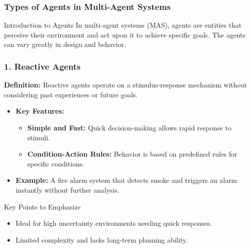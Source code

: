 \documentclass[aspectratio=169]{beamer}
\begin{document}
\begin{frame}[fragile]
    \frametitle{Types of Agents in Multi-Agent Systems}
    \begin{block}{Introduction to Agents}
        In multi-agent systems (MAS), agents are entities that perceive their environment and act upon it to achieve specific goals. The agents can vary greatly in design and behavior.
    \end{block}
\end{frame}

\begin{frame}[fragile]
    \frametitle{1. Reactive Agents}
    \textbf{Definition:}  
    Reactive agents operate on a stimulus-response mechanism without considering past experiences or future goals.

    \begin{itemize}
        \item \textbf{Key Features:}
        \begin{itemize}
            \item \textbf{Simple and Fast:} Quick decision-making allows rapid response to stimuli.
            \item \textbf{Condition-Action Rules:} Behavior is based on predefined rules for specific conditions.
        \end{itemize}
        \item \textbf{Example:} 
        A fire alarm system that detects smoke and triggers an alarm instantly without further analysis.
    \end{itemize}
    
    \begin{block}{Key Points to Emphasize}
        \begin{itemize}
            \item Ideal for high uncertainty environments needing quick responses.
            \item Limited complexity and lacks long-term planning ability.
        \end{itemize}
    \end{block}
\end{frame}
\end{document}
